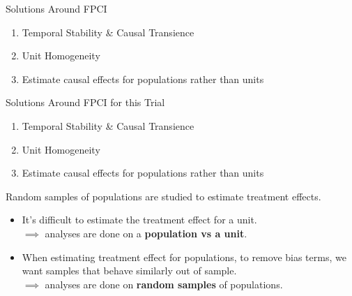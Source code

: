 \documentclass{beamer}
\begin{document}
\begin{frame}{Solutions Around FPCI}
  \begin{enumerate}
    \item<+-> Temporal Stability \& Causal Transience
    \item<+-> Unit Homogeneity
    \item<+-> Estimate causal effects for populations rather than units
  \end{enumerate}
\end{frame}

\begin{frame}{Solutions Around FPCI for this Trial}
  \begin{enumerate}
    \item Temporal Stability \& Causal Transience {\color{red}{X}}
    \item Unit Homogeneity {\color{red}{X}}
    \item Estimate causal effects for populations rather than units {\color{green}{\checkmark}}
  \end{enumerate}
\end{frame}

\begin{frame}{Random samples of populations are studied to estimate treatment effects.}
  \begin{itemize}
    \item<+-> It's difficult to estimate the treatment effect for a unit. \\
    \indent $\implies$ analyses are done on a \textbf{population vs a unit}.
    \item<+-> When estimating treatment effect for populations, to remove bias terms, we want samples that behave similarly out of sample. \\
    \indent $\implies$ analyses are done on \textbf{random samples} of populations.
  \end{itemize}
\end{frame}
\end{document}
